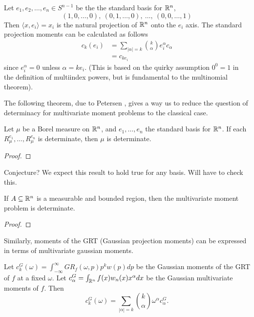 \begin{myexample}
  Let $e_1, e_2, \ldots, e_n \in S^{n-1}$ be the the standard basis for $\mathbb{R}^n$,
  \[
    (1, 0, \ldots, 0),~ (0, 1, \ldots, 0),~ \ldots,~ (0,0, \ldots, 1)
  \]
  Then $\langle x, e_i \rangle = x_i$ is the natural projection of $\mathbb{R}^n$ onto the $e_i$ axis. The standard projection moments can be calculated as follows
  \begin{align*}
    c_k(e_i) 
    &= \sum_{|\alpha| = k} \binom{k}{\alpha} e_i^\alpha c_\alpha \\
    &= c_{ke_i}
  \end{align*}
  since $e_i^\alpha = 0$ unless $\alpha = ke_i$. (This is based on the quirky assumption $0^0 = 1$ in the definition of multiindex powers, but is fundamental to the multinomial theorem).
\end{myexample}

The following theorem, due to Petersen \cn, gives a way us to reduce the question of determinacy for multivariate moment problems to the classical case.
\begin{proposition}
  Let $\mu$ be a Borel measure on $\mathbb{R}^n$, and $e_1, \ldots, e_n$ the standard basis for $\mathbb{R}^n$. If each $R_\mu^{e_1}, \ldots, R_\mu^{e_n}$ is determinate, then $\mu$ is determinate.
\end{proposition}
\begin{proof}
  \pn
\end{proof}
\begin{remark}
  Conjecture? We expect this result to hold true for any basis. Will have to check this.
\end{remark}

\begin{corollary}
  If $A \subseteq \mathbb{R}^n$ is a measurable and bounded region, then the multivariate moment problem is determinate.
\end{corollary}
\begin{proof}
  \pn
\end{proof}
Similarly, moments of the GRT (Gaussian projection moments) can be expressed in terms of multivariate gaussian moments.

\begin{proposition}
  Let $c_k^G(\omega) = \int_{-\infty}^\infty GR_f(\omega, p) p^k w(p) dp$ be the Gaussian moments of the GRT of $f$ at a fixed $\omega$. Let $c^G_\alpha = \int_{\mathbb{R}^n} f(x) w_n(x) x^\alpha dx$ be the Gaussian multivariate moments of $f$. Then
  \[
    c^G_k(\omega) = \sum_{|\alpha| = k}\binom{k}{\alpha} \omega^\alpha c^G_\alpha.
  \]
\end{proposition}



